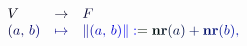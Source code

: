 \documentclass[12pt]{article}
\begin{document}
\makeatletter
\renewcommand*{\@textcolor}[3]{%
  \protect\leavevmode
  \begingroup
    \color#1{#2}#3%
  \endgroup
}
\makeatother
\begin{displaymath}
\begin{array} {r} { { \begin{array} {lrl} { { \mathcolor[RGB]{0,0,15}{V} } } & { { \mathcolor[RGB]{0,0,30}{\to} } } & { { \mathcolor[RGB]{0,0,45}{F} } } \\ { { \mathcolor[RGB]{0,0,60}{(} \mathcolor[RGB]{0,0,75}{a} \mathcolor[RGB]{0,0,90}{,} \, \mathcolor[RGB]{0,0,105}{b} \mathcolor[RGB]{0,0,120}{)} } } & { { \mathcolor[RGB]{0,0,135}{\mapsto} } } & { { \mathcolor[RGB]{0,0,150}{\|} \mathcolor[RGB]{0,0,165}{(} \mathcolor[RGB]{0,0,180}{a} \mathcolor[RGB]{0,0,195}{,} \, \mathcolor[RGB]{0,0,210}{b} \mathcolor[RGB]{0,0,225}{)} \mathcolor[RGB]{0,0,240}{\|} \mathcolor[RGB]{0,0,255}{:} \mathcolor[RGB]{0,15,0}{=} \mathbf { \mathcolor[RGB]{0,15,15}{n} \mathcolor[RGB]{0,15,30}{r} } \mathcolor[RGB]{0,15,45}{(} \mathcolor[RGB]{0,15,60}{a} \mathcolor[RGB]{0,15,75}{)} \mathcolor[RGB]{0,15,90}{+} \mathbf { \mathcolor[RGB]{0,15,105}{n} \mathcolor[RGB]{0,15,120}{r} } \mathcolor[RGB]{0,15,135}{(} \mathcolor[RGB]{0,15,150}{b} \mathcolor[RGB]{0,15,165}{)} \mathcolor[RGB]{0,15,180}{,} } } \end{array} } } \end{array}
\end{displaymath}
\end{document}
